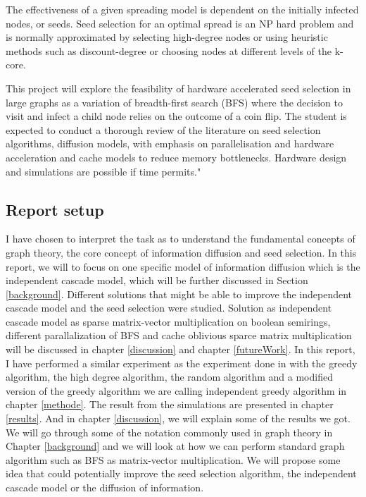 The effectiveness of a given spreading model is dependent on the initially infected nodes, or seeds. Seed selection for an optimal spread is an NP hard problem and is normally approximated by selecting high-degree nodes or using heuristic methods such as discount-degree or choosing nodes at different levels of the k-core.

This project will explore the feasibility of hardware accelerated seed selection in large graphs as a variation of breadth-first search (BFS) where the decision to visit and infect a child node relies on the outcome of a coin flip. The student is expected to conduct a thorough review of the literature on seed selection algorithms, diffusion models, with emphasis on parallelisation and hardware acceleration and cache models to reduce memory bottlenecks. Hardware design and simulations are possible if time permits."


\subsection{Report setup}
I have chosen to interpret the task as to understand the fundamental concepts of graph theory, the core concept of information diffusion and seed selection. In this report, we will to focus on one specific model of information diffusion which is the independent cascade model, which will be further discussed in Section \ref{background}. Different solutions that might be able to improve the independent cascade model and the seed selection were studied. Solution as independent cascade model as sparse matrix-vector multiplication on boolean semirings, different parallalization of BFS and cache oblivious sparce matrix multiplication will be discussed in chapter \ref{discussion} and chapter \ref{futureWork}. In this report, I have performed a similar experiment as the experiment done in \cite{MaximizeSpread2003} with the greedy algorithm, the high degree algorithm, the random algorithm and a modified version of the greedy algorithm we are calling independent greedy algorithm in chapter \ref{methode}. The result from the simulations are presented in chapter \ref{results}. And in chapter \ref{discussion}, we will explain some of the results we got. We will go through some of the notation commonly used in graph theory in Chapter \ref{background} and we will look at how we can perform standard graph algorithm such as BFS as matrix-vector multiplication. We will propose some idea that could potentially improve the seed selection algorithm, the independent cascade model or the diffusion of information.
